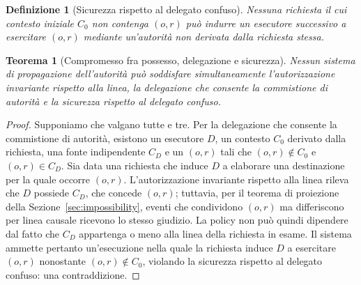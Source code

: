 \documentclass[11pt]{article}
\newtheorem{definition}{Definizione}
\newtheorem{theorem}{Teorema}
\begin{document}
\begin{definition}[Sicurezza rispetto al delegato confuso]
Nessuna richiesta il cui contesto iniziale $C_0$ non contenga $(o,r)$ può
indurre un esecutore successivo a esercitare $(o,r)$ mediante un'autorità non
derivata dalla richiesta stessa.
\end{definition}

\begin{theorem}[Compromesso fra possesso, delegazione e sicurezza]
Nessun sistema di propagazione dell'autorità può soddisfare simultaneamente
l'autorizzazione invariante rispetto alla linea, la delegazione che consente la
commistione di autorità e la sicurezza rispetto al delegato confuso.
\end{theorem}

\begin{proof}
Supponiamo che valgano tutte e tre. Per la delegazione che consente la
commistione di autorità, esistono un esecutore $D$, un contesto $C_0$ derivato
dalla richiesta, una fonte indipendente $C_D$ e un $(o,r)$ tali che
$(o,r) \notin C_0$ e $(o,r) \in C_D$. Sia data una richiesta che induce $D$ a
elaborare una destinazione per la quale occorre $(o,r)$. L'autorizzazione
invariante rispetto alla linea rileva che $D$ possiede $C_D$, che concede
$(o,r)$; tuttavia, per il teorema di proiezione della
Sezione~\ref{sec:impossibility}, eventi che condividono $(o,r)$ ma differiscono
per linea causale ricevono lo stesso giudizio. La policy non può quindi dipendere
dal fatto che $C_D$ appartenga o meno alla linea della richiesta in esame. Il
sistema ammette pertanto un'esecuzione nella quale la richiesta induce $D$ a
esercitare $(o,r)$ nonostante $(o,r) \notin C_0$, violando la sicurezza rispetto
al delegato confuso: una contraddizione.
\end{proof}
\end{document}
